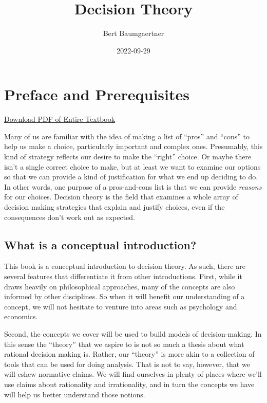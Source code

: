 \documentclass[]{tufte-book}
\title{Decision Theory}
\author{Bert Baumgaertner}
\date{2022-09-29}
\begin{document}
\maketitle



{
\setcounter{tocdepth}{0}
\tableofcontents
}

\hypertarget{preface-and-prerequisites}{%
\chapter*{Preface and Prerequisites}\label{preface-and-prerequisites}}

\href{decisiontheory.pdf}{Download PDF of Entire Textbook}

Many of us are familiar with the idea of making a list of ``pros'' and ``cons'' to help us make a choice, particularly important and complex ones. Presumably, this kind of strategy reflects our desire to make the ``right'' choice. Or maybe there isn't a single correct choice to make, but at least we want to examine our options so that we can provide a kind of justification for what we end up deciding to do. In other words, one purpose of a pros-and-cons list is that we can provide \emph{reasons} for our choices. Decision theory is the field that examines a whole array of decision making strategies that explain and justify choices, even if the consequences don't work out as expected.

\hypertarget{what-is-a-conceptual-introduction}{%
\section{What is a conceptual introduction?}\label{what-is-a-conceptual-introduction}}

This book is a conceptual introduction to decision theory. As such, there are several features that differentiate it from other introductions. First, while it draws heavily on philosophical approaches, many of the concepts are also informed by other disciplines. So when it will benefit our understanding of a concept, we will not hesitate to venture into areas such as psychology and economics.

Second, the concepts we cover will be used to build models of decision-making. In this sense the ``theory'' that we aspire to is not so much a thesis about what rational decision making is. Rather, our ``theory'' is more akin to a collection of tools that can be used for doing analysis. That is not to say, however, that we will eshew normative claims. We will find ourselves in plenty of places where we'll use claims about rationality and irrationality, and in turn the concepts we have will help us better understand those notions.
\end{document}

